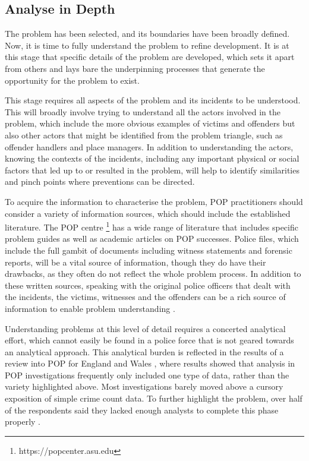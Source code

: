 \subsection{Analyse in Depth} The problem has been selected, and its boundaries have been broadly defined. Now, it is time to fully understand the problem to refine development. It is at this stage that specific details of the problem are developed, which sets it apart from others and lays bare the underpinning processes that generate the opportunity for the problem to exist.

This stage requires all aspects of the problem and its incidents to be understood\parencite{clarke2003becoming}. This will broadly involve trying to understand all the actors involved in the problem, which include the more obvious examples of victims and offenders but also other actors that might be identified from the problem triangle, such as offender handlers and place managers. In addition to understanding the actors, knowing the contexts of the incidents, including any important physical or social factors that led up to or resulted in the problem, will help to identify similarities and pinch points where preventions can be directed.

To acquire the information to characterise the problem, POP practitioners should consider a variety of information sources, which should include the established literature. The POP centre \footnote{https://popcenter.asu.edu} has a wide range of literature that includes specific problem guides as well as academic articles on POP successes. Police files, which include the full gambit of documents including witness statements and forensic reports, will be a vital source of information, though they do have their drawbacks, as they often do not reflect the whole problem process. In addition to these written sources, speaking with the original police officers that dealt with the incidents, the victims, witnesses and the offenders can be a rich source of information to enable problem understanding \parencite{goldstein1990}. 

Understanding problems at this level of detail requires a concerted analytical effort, which cannot easily be found in a police force that is not geared towards an analytical approach. This analytical burden is reflected in the results of a review into POP for England and Wales \parencite{POPUCL}, where results showed that analysis in POP investigations frequently only included one type of data, rather than the variety highlighted above. Most investigations barely moved above a cursory exposition of simple crime count data. To further highlight the problem, over half of the respondents said they lacked enough analysts to complete this phase properly \parencite{POPUCL}. 

